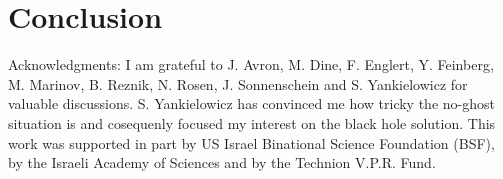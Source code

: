 \documentclass[11pt]{article}
\begin{document}
\section{Conclusion}

Acknowledgments: I am grateful to J. Avron, M. Dine, F. Englert, Y. Feinberg, M. Marinov, B. Reznik, N. Rosen, J. Sonnenschein and S. Yankielowicz for valuable discussions. S. Yankielowicz has convinced me how tricky the no-ghost situation is and cosequenly focused my interest on the black hole solution. This work was supported in part by US Israel Binational Science Foundation (BSF), by the Israeli Academy of Sciences and by the Technion V.P.R. Fund.
\end{document}
